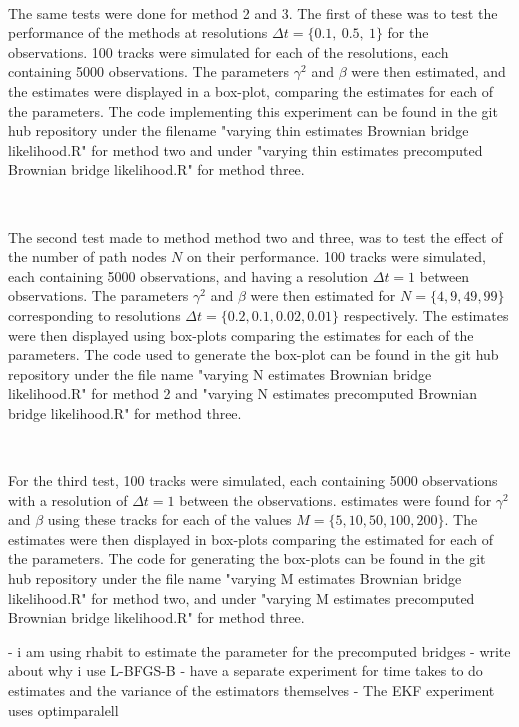 \

The same tests were done for method 2 and 3. The first of these was to test the performance of the methods at resolutions $\Delta t = \{0.1, \ 0.5, \ 1\}$ for the observations. 100 tracks were simulated for each of the resolutions, each containing 5000 observations. The parameters $\gamma^2$ and $\beta$ were then estimated, and the estimates were displayed in a box-plot, comparing the estimates for each of the parameters. The code implementing this experiment can be found in the git hub repository under the filename "varying thin estimates Brownian bridge likelihood.R" for method two and under "varying thin estimates precomputed Brownian bridge likelihood.R" for method three.

\

The second test made to method method two and three, was to test the effect of the number of path nodes $N$ on their performance. 100 tracks were simulated, each containing 5000 observations, and having a resolution $\Delta t = 1$ between observations. The parameters $\gamma^2$ and $\beta$ were then estimated for $N = \{4, 9, 49, 99\}$ corresponding to resolutions $\Delta t = \{0.2, 0.1, 0.02, 0.01\}$ respectively. The estimates were then displayed using box-plots comparing the estimates for each of the parameters. The code used to generate the box-plot can be found in the git hub repository under the file name "varying N estimates Brownian bridge likelihood.R" for method 2 and "varying N estimates precomputed Brownian bridge likelihood.R" for method three.

\

For the third test, 100 tracks were simulated, each containing 5000 observations with a resolution of $\Delta t = 1$ between the observations. estimates were found for $\gamma^2$ and $\beta$ using these tracks for each of the values $M = \{5, 10, 50, 100, 200\}$. The estimates were then displayed in box-plots comparing the estimated for each of the parameters. The code for generating the box-plots can be found in the git hub repository under the file name "varying M estimates Brownian bridge likelihood.R" for method two, and under "varying M estimates precomputed Brownian bridge likelihood.R" for method three.


-  i am using rhabit to estimate the parameter for the precomputed bridges
- write about why i use L-BFGS-B
- have a separate experiment for time takes to do estimates and the variance of the estimators themselves
- The EKF experiment uses optimparalell

